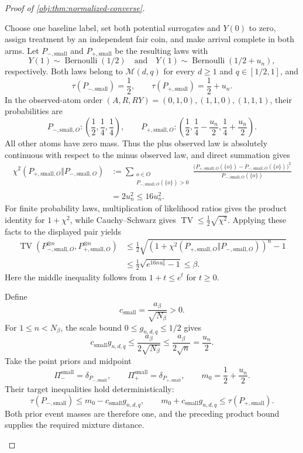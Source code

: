\documentclass[11pt]{article}
\begin{document}
\begin{proof}[Proof of \cref{obj:thm:normalized-converse}]
\begin{enumerate}
Choose one baseline label, set both potential surrogates and \(Y(0)\) to zero, assign treatment by an independent fair coin, and make arrival complete in both arms. Let
\(P_{-,\mathrm{small}}\) and \(P_{+,\mathrm{small}}\) be the resulting laws with
\[
Y(1)\sim\operatorname{Bernoulli}(1/2)
\quad\text{and}\quad
Y(1)\sim\operatorname{Bernoulli}(1/2+u_n),
\]
respectively. Both laws belong to \(\mathcal M(d,q)\) for every \(d\ge1\) and \(q\in[1/2,1]\), and
\[
\tau(P_{-,\mathrm{small}})=\frac12,
\qquad
\tau(P_{+,\mathrm{small}})=\frac12+u_n.
\]
In the observed-atom order
\((A,R,RY)=(0,1,0),(1,1,0),(1,1,1)\), their probabilities are
\[
P_{-,\mathrm{small},O}:
\left(\frac12,\frac14,\frac14\right),
\qquad
P_{+,\mathrm{small},O}:
\left(\frac12,\frac14-\frac{u_n}{2},
                 \frac14+\frac{u_n}{2}\right).
\]
All other atoms have zero mass. Thus the plus observed law is absolutely continuous with respect to the minus observed law, and direct summation gives
\[
\begin{aligned}
\chi^2(P_{+,\mathrm{small},O}\Vert P_{-,\mathrm{small},O})
&:=
\sum_{\substack{o\in O\\
P_{-,\mathrm{small},O}(\{o\})>0}}
\frac{
\bigl(P_{+,\mathrm{small},O}(\{o\})
-P_{-,\mathrm{small},O}(\{o\})\bigr)^2}
{P_{-,\mathrm{small},O}(\{o\})}\\
&=2u_n^2\le16u_n^2.
\end{aligned}
\]
For finite probability laws, multiplication of likelihood ratios gives the product identity for \(1+\chi^2\), while Cauchy--Schwarz gives
\(\operatorname{TV}\le\frac12\sqrt{\chi^2}\).
Applying these facts to the displayed pair yields
\[
\begin{aligned}
\operatorname{TV}
\left(P_{-,\mathrm{small},O}^{\otimes n},
      P_{+,\mathrm{small},O}^{\otimes n}\right)
&\le
\frac12\sqrt{
\left(1+
\chi^2(P_{+,\mathrm{small},O}\Vert
       P_{-,\mathrm{small},O})\right)^n-1}\\
&\le\frac12\sqrt{e^{16nu_n^2}-1}
\le\beta.
\end{aligned}
\]
Here the middle inequality follows from \(1+t\le e^t\) for \(t\ge0\).

Define
\[
c_{\mathrm{small}}=\frac{a_\beta}{\sqrt{N_\beta}}>0.
\]
For \(1\le n<N_\beta\), the scale bound
\(0\le g_{n,d,q}\le1/2\) gives
\[
c_{\mathrm{small}}g_{n,d,q}
\le\frac{a_\beta}{2\sqrt{N_\beta}}
\le\frac{a_\beta}{2\sqrt n}
=\frac{u_n}{2}.
\]
Take the point priors and midpoint
\[
\Pi_-^{\mathrm{small}}=\delta_{P_{-,\mathrm{small}}},
\qquad
\Pi_+^{\mathrm{small}}=\delta_{P_{+,\mathrm{small}}},
\qquad
m_0=\frac12+\frac{u_n}{2}.
\]
Their target inequalities hold deterministically:
\[
\tau(P_{-,\mathrm{small}})
\le m_0-c_{\mathrm{small}}g_{n,d,q},
\qquad
m_0+c_{\mathrm{small}}g_{n,d,q}
\le\tau(P_{+,\mathrm{small}}).
\]
Both prior event masses are therefore one, and the preceding product bound supplies the required mixture distance.


\end{enumerate}
\end{proof}
\end{document}
